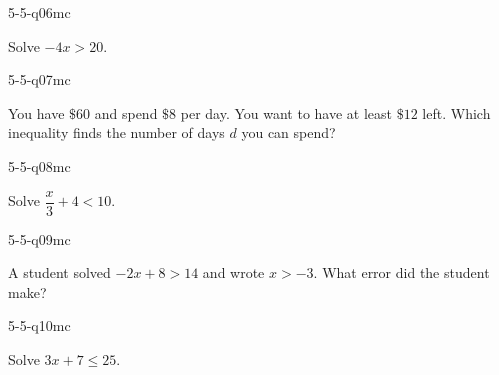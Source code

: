\begin{practiceQuestion}{5-5-q06}{mc}
\begin{questionText}
Solve $-4x > 20$.
\end{questionText}
\end{practiceQuestion}

\begin{practiceQuestion}{5-5-q07}{mc}
\begin{questionText}
You have $\$60$ and spend $\$8$ per day. You want to have at least $\$12$ left. Which inequality finds the number of days $d$ you can spend?
\end{questionText}
\end{practiceQuestion}

\begin{practiceQuestion}{5-5-q08}{mc}
\begin{questionText}
Solve $\dfrac{x}{3} + 4 < 10$.
\end{questionText}
\end{practiceQuestion}

\begin{practiceQuestion}{5-5-q09}{mc}
\begin{questionText}
A student solved $-2x + 8 > 14$ and wrote $x > -3$. What error did the student make?
\end{questionText}
\end{practiceQuestion}

\begin{practiceQuestion}{5-5-q10}{mc}
\begin{questionText}
Solve $3x + 7 \leq 25$.
\end{questionText}
\end{practiceQuestion}

